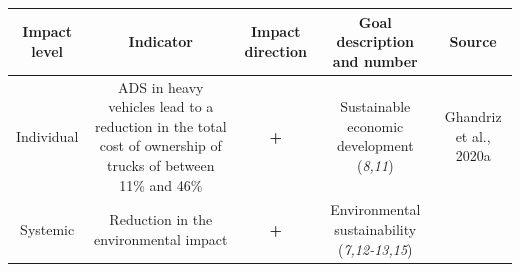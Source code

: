 \documentclass[
]{book}
\begin{document}
\begin{longtable}[]{@{}ccccc@{}}
\toprule
\begin{minipage}[b]{0.17\columnwidth}\centering
Impact level\strut
\end{minipage} & \begin{minipage}[b]{0.16\columnwidth}\centering
Indicator\strut
\end{minipage} & \begin{minipage}[b]{0.17\columnwidth}\centering
Impact direction\strut
\end{minipage} & \begin{minipage}[b]{0.17\columnwidth}\centering
Goal description and number\strut
\end{minipage} & \begin{minipage}[b]{0.17\columnwidth}\centering
Source\strut
\end{minipage}\tabularnewline
\midrule
\endhead
\begin{minipage}[t]{0.17\columnwidth}\centering
Individual\strut
\end{minipage} & \begin{minipage}[t]{0.16\columnwidth}\centering
ADS in heavy vehicles lead to a reduction in the total cost of ownership of trucks of between 11\% and 46\%\strut
\end{minipage} & \begin{minipage}[t]{0.17\columnwidth}\centering
\textbf{+}\strut
\end{minipage} & \begin{minipage}[t]{0.17\columnwidth}\centering
Sustainable economic development (\emph{8,11})\strut
\end{minipage} & \begin{minipage}[t]{0.17\columnwidth}\centering
Ghandriz et al., 2020a\strut
\end{minipage}\tabularnewline
\begin{minipage}[t]{0.17\columnwidth}\centering
Systemic\strut
\end{minipage} & \begin{minipage}[t]{0.16\columnwidth}\centering
Reduction in the environmental impact\strut
\end{minipage} & \begin{minipage}[t]{0.17\columnwidth}\centering
\textbf{+}\strut
\end{minipage} & \begin{minipage}[t]{0.17\columnwidth}\centering
Environmental sustainability (\emph{7,12-13,15})\strut
\end{minipage} & \begin{minipage}[t]{0.17\columnwidth}\centering

\end{minipage}
\end{longtable}
\end{document}
